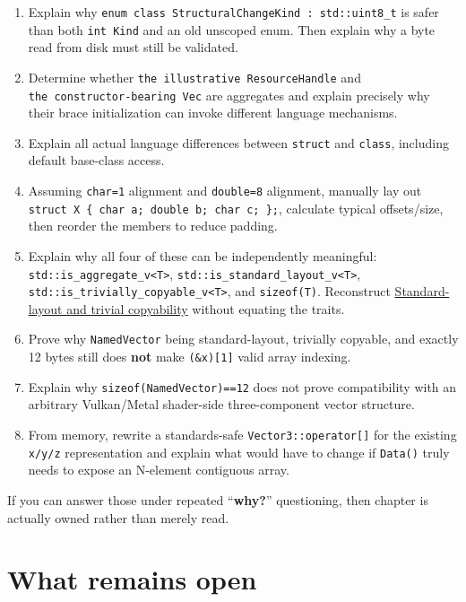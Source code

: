 \begin{enumerate}
\item
  Explain why \texttt{enum\ class\ StructuralChangeKind\ :\ std::uint8\_t} is safer than both \texttt{int\ Kind} and an old unscoped enum. Then explain why a byte read from disk must still be validated.
\item
  Determine whether \texttt{the\ illustrative\ ResourceHandle} and \texttt{the\ constructor-bearing\ Vec} are aggregates and explain precisely why their brace initialization can invoke different language mechanisms.
\item
  Explain all actual language differences between \texttt{struct} and \texttt{class}, including default base-class access.
\item
  Assuming \texttt{char=1} alignment and \texttt{double=8} alignment, manually lay out \texttt{struct\ X\ \{\ char\ a;\ double\ b;\ char\ c;\ \};}, calculate typical offsets/size, then reorder the members to reduce padding.
\item
  Explain why all four of these can be independently meaningful: \texttt{std::is\_aggregate\_v\textless{}T\textgreater{}}, \texttt{std::is\_standard\_layout\_v\textless{}T\textgreater{}}, \texttt{std::is\_trivially\_copyable\_v\textless{}T\textgreater{}}, and \texttt{sizeof(T)}. Reconstruct \hyperref[appendix-958870a64c53]{Standard-layout and trivial copyability} without equating the traits.
\item
  Prove why \texttt{NamedVector} being standard-layout, trivially copyable, and exactly 12 bytes still does \textbf{not} make \texttt{(\&x){[}1{]}} valid array indexing.
\item
  Explain why \texttt{sizeof(NamedVector)==12} does not prove compatibility with an arbitrary Vulkan/Metal shader-side three-component vector structure.
\item
  From memory, rewrite a standards-safe \texttt{Vector3::operator{[}{]}} for the existing \texttt{x/y/z} representation and explain what would have to change if \texttt{Data()} truly needs to expose an N-element contiguous array.
\end{enumerate}

If you can answer those under repeated ``\textbf{why?}'' questioning, then chapter is actually owned rather than merely read.

\section{What remains open}\label{05-engine-i-ch004-what-remains-open}

